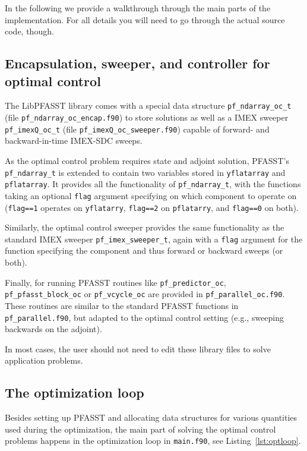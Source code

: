 \documentclass[a4paper]{article} %
\begin{document}
In the following we provide a walkthrough through the main parts of the implementation. For all details you will need to go through the actual source code, though.

\subsection{Encapsulation, sweeper, and controller for optimal control}

The LibPFASST library comes with a special data structure \lstinline|pf_ndarray_oc_t| (file \lstinline|pf_ndarray_oc_encap.f90|) to store solutions as well as a IMEX sweeper \lstinline|pf_imexQ_oc_t| (file \lstinline|pf_imexQ_oc_sweeper.f90|) capable of forward- and backward-in-time IMEX-SDC sweeps.

As the optimal control problem requires state and adjoint solution, PFASST's \lstinline|pf_ndarray_t| is extended to contain two variables stored in \lstinline|yflatarray| and \lstinline|pflatarray|. It provides all the functionality of \lstinline|pf_ndarray_t|, with the functions taking an optional \lstinline|flag| argument specifying on which component to operate on (\lstinline|flag==1| operates on \lstinline|yflatarry|, \lstinline|flag==2|  on \lstinline|pflatarry|, and \lstinline|flag==0| on both).

Similarly, the optimal control sweeper provides the same functionality as the standard IMEX sweeper \lstinline|pf_imex_sweeper_t|, again with a \lstinline|flag| argument for the function specifying the component and thus forward or backward sweeps (or both).

Finally, for running PFASST routines like \lstinline|pf_predictor_oc|, \lstinline|pf_pfasst_block_oc| or \lstinline|pf_vcycle_oc| are provided in \lstinline|pf_parallel_oc.f90|. These routines are similar to the standard PFASST functions in \lstinline|pf_parallel.f90|, but adapted to the optimal control setting (e.g., sweeping backwards on the adjoint).

In most cases, the user should not need to edit these library files to solve application problems.

\subsection{The optimization loop}

Besides setting up PFASST and allocating data structures for various quantities used during the optimization, the main part of solving the optimal control problems happens in the optimization loop in \lstinline|main.f90|, see Listing~\ref{lst:optloop}.
\end{document}
